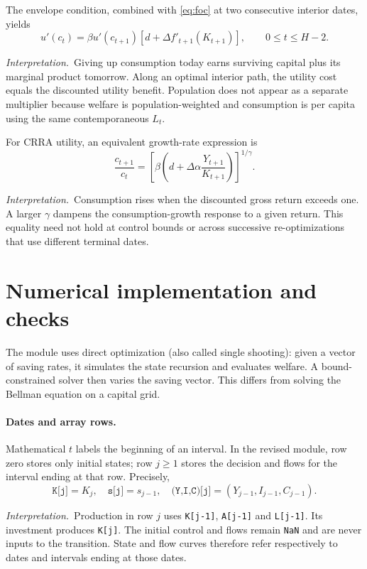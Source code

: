 \documentclass[11pt,a4paper]{article}
\newcommand{\interp}{\par\smallskip\noindent\textit{Interpretation.}\ }
\begin{document}
The envelope condition, combined with \eqref{eq:foc} at two consecutive
interior dates, yields
\begin{equation}\label{eq:euler}
 u'(c_t)=\beta u'(c_{t+1})
 \left[d+\Delta f'_{t+1}(K_{t+1})\right],
 \qquad 0\leq t\leq H-2.
\end{equation}
\interp Giving up consumption today earns surviving capital plus its
marginal product tomorrow. Along an optimal interior path, the utility
cost equals the discounted utility benefit. Population does not appear
as a separate multiplier because welfare is population-weighted and
consumption is per capita using the same contemporaneous $L_t$.

For CRRA utility, an equivalent growth-rate expression is
\begin{equation}\label{eq:consumptiongrowth}
 \frac{c_{t+1}}{c_t}
 =\left[\beta\left(d+\Delta\alpha
                  \frac{Y_{t+1}}{K_{t+1}}\right)\right]^{1/\gamma}.
\end{equation}
\interp Consumption rises when the discounted gross return exceeds one.
A larger $\gamma$ dampens the consumption-growth response to a given
return. This equality need not hold at control bounds or across successive
re-optimizations that use different terminal dates.

\section{Numerical implementation and checks}
The module uses direct optimization (also called single shooting):
given a vector of saving rates, it simulates the state recursion and
evaluates welfare. A bound-constrained solver then varies the saving vector.
This differs from solving the Bellman equation on a capital grid.

\paragraph{Dates and array rows.}
Mathematical $t$ labels the beginning of an interval. In the revised module,
row zero stores only initial states; row $j\geq1$ stores the decision and
flows for the interval ending at that row. Precisely,
\begin{equation}\label{eq:codemap}
 \texttt{K[j]}=K_j,\quad
 \texttt{s[j]}=s_{j-1},\quad
 \texttt{(Y,I,C)[j]}=(Y_{j-1},I_{j-1},C_{j-1}).
\end{equation}
\interp Production in row $j$ uses \texttt{K[j-1]}, \texttt{A[j-1]}
and \texttt{L[j-1]}. Its investment produces \texttt{K[j]}.
The initial control and flows remain \texttt{NaN} and are never inputs
to the transition. State and flow curves therefore refer respectively
to dates and intervals ending at those dates.
\end{document}
